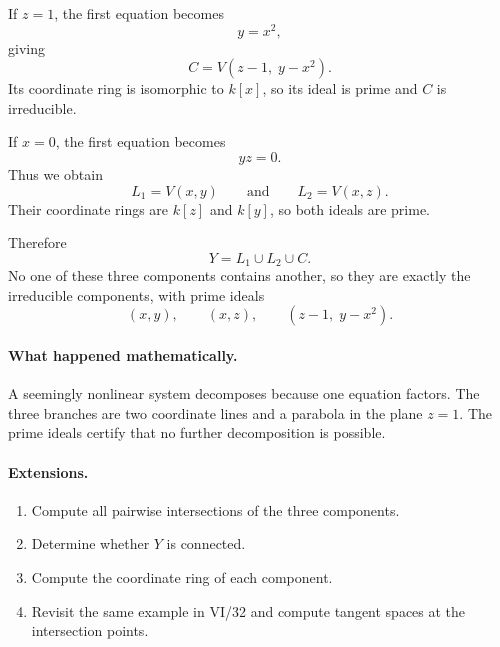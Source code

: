If \(z=1\), the first equation becomes
\[
y=x^2,
\]
giving
\[
C=V(z-1,\;y-x^2).
\]
Its coordinate ring is isomorphic to \(k[x]\), so its ideal is prime and \(C\) is
irreducible.

If \(x=0\), the first equation becomes
\[
yz=0.
\]
Thus we obtain
\[
L_1=V(x,y)
\qquad\text{and}\qquad
L_2=V(x,z).
\]
Their coordinate rings are \(k[z]\) and \(k[y]\), so both ideals are prime.

Therefore
\[
Y=L_1\cup L_2\cup C.
\]
No one of these three components contains another, so they are exactly the irreducible
components, with prime ideals
\[
(x,y),
\qquad
(x,z),
\qquad
(z-1,\;y-x^2).
\]

\paragraph{What happened mathematically.}
A seemingly nonlinear system decomposes because one equation factors.  The three
branches are two coordinate lines and a parabola in the plane \(z=1\).  The prime ideals
certify that no further decomposition is possible.

\paragraph{Extensions.}
\begin{enumerate}
\item Compute all pairwise intersections of the three components.
\item Determine whether \(Y\) is connected.
\item Compute the coordinate ring of each component.
\item Revisit the same example in VI/32 and compute tangent spaces at the intersection
points.
\end{enumerate}
\fi
